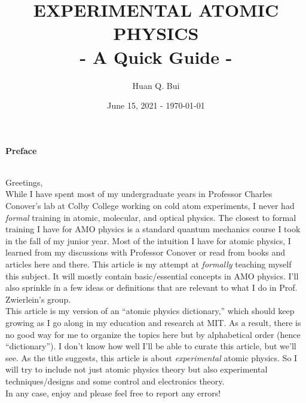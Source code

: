 \documentclass{book}
\theoremstyle{definition}
\begin{document}
\begin{titlepage}\centering
 \clearpage
 \title{{\textsc{\textbf{EXPERIMENTAL ATOMIC PHYSICS}}}\\ \smallskip - A Quick Guide - \\}
 \author{\bigskip Huan Q. Bui}
 \date{June 15, 2021 - \today}
 \maketitle
 \thispagestyle{empty}
\end{titlepage}

\noindent \textbf{Preface}


$\,$\\


\noindent Greetings, \\


While I have spent most of my undergraduate years in Professor Charles Conover's lab at Colby College working on cold atom experiments, I never had \textit{formal} training in atomic, molecular, and optical physics. The closest to formal training I have for AMO physics is a standard quantum mechanics course I took in the fall of my junior year. Most of the intuition I have for atomic physics, I learned from my discussions with Professor Conover or read from books and articles here and there. This article is my attempt at \textit{formally} teaching myself this subject. It will mostly contain basic/essential concepts in AMO physics. I'll also sprinkle in a few ideas or definitions that are relevant to what I do in Prof. Zwierlein's group. \\

This article is my version of an ``atomic physics dictionary,'' which should keep growing as I go along in my education and research at MIT. As a result, there is no good way for me to organize the topics here but by alphabetical order (hence ``dictionary''). I don't know how well I'll be able to curate this article, but we'll see. As the title suggests, this article is about \textit{experimental} atomic physics. So I will try to include not just atomic physics theory but also experimental techniques/designs and some control and electronics theory. \\


In any case, enjoy and please feel free to report any errors!


\newpage
\end{document}
